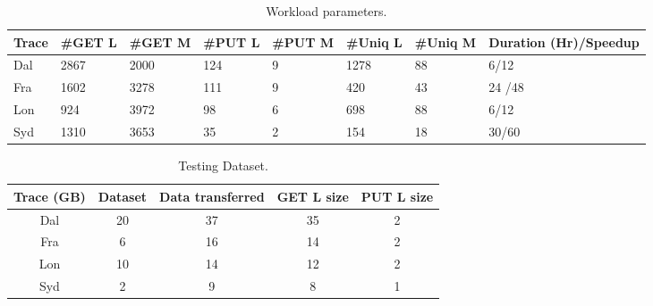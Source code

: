 
\begin{table}[h!]
	\scriptsize
	\caption{Workload parameters.}
	\begin{tabular}{| p{0.38cm} | p{0.5cm} | p{0.5cm} | p{0.5cm} | p{0.5cm}| p{0.5cm}| p{0.5cm}| p{1.25cm} |} 
		\hline
	Trace    &   \#GET L & \#GET M & \#PUT L & \#PUT M & \#Uniq L & \#Uniq M & Duration (Hr)/Speedup \\ 
		\hline\hline
		Dal    &  2867  & 2000   & 124  & 9     & 1278 & 88  & 6/12    \\ 
		\hline
		Fra     &  1602  & 3278   & 111  & 9     & 420 & 43  & 24 /48   \\
		\hline
		Lon    &  924    & 3972   & 98  & 6      & 698 & 88  & 6/12    \\
		\hline 
		Syd      &  1310   & 3653   & 35 & 2     & 154 & 18  & 30/60    \\  
		\hline
	\end{tabular}

\label{tab:eval-overall}
\end{table}


\begin{table}[h!]
	\scriptsize 
	\caption{Testing Dataset.}
	\begin{tabular}{| c | c | c | c | c | } 
		\hline
		Trace  (GB)  &   Dataset  & Data transferred  & GET L size  & PUT L size  \\ 
		\hline\hline
		Dal   & 20  & 37 & 35 & 2    \\ 
		\hline
		Fra     & 6  & 16 & 14 & 2   \\
		\hline
		Lon    &10   &  14 &12  & 2      \\
		\hline 
		Syd      &  2  &  9 & 8 & 1      \\  
		\hline
	\end{tabular}
	
	\label{tab:eval-dataset}
\end{table}



